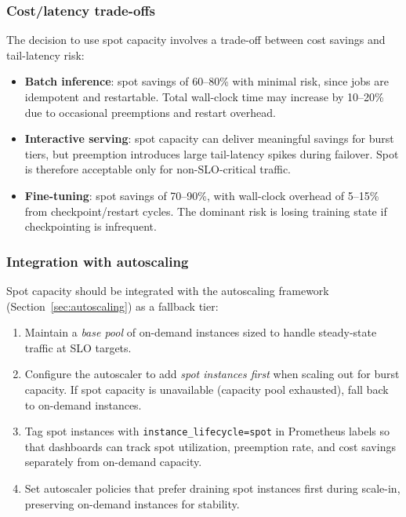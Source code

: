 \subsubsection{Cost/latency trade-offs}
The decision to use spot capacity involves a trade-off between cost savings and tail-latency risk:

\begin{itemize}
    \item \textbf{Batch inference}: spot savings of 60--80\% with minimal risk, since jobs are idempotent and restartable. Total wall-clock time may increase by 10--20\% due to occasional preemptions and restart overhead.
    \item \textbf{Interactive serving}: spot capacity can deliver meaningful savings for burst tiers, but preemption introduces large tail-latency spikes during failover. Spot is therefore acceptable only for non-SLO-critical traffic.
    \item \textbf{Fine-tuning}: spot savings of 70--90\%, with wall-clock overhead of 5--15\% from checkpoint/restart cycles. The dominant risk is losing training state if checkpointing is infrequent.
\end{itemize}

\subsubsection{Integration with autoscaling}
Spot capacity should be integrated with the autoscaling framework (Section~\ref{sec:autoscaling}) as a fallback tier:

\begin{enumerate}
    \item Maintain a \emph{base pool} of on-demand instances sized to handle steady-state traffic at SLO targets.
    \item Configure the autoscaler to add \emph{spot instances first} when scaling out for burst capacity. If spot capacity is unavailable (capacity pool exhausted), fall back to on-demand instances.
    \item Tag spot instances with \texttt{instance\_lifecycle=spot} in Prometheus labels so that dashboards can track spot utilization, preemption rate, and cost savings separately from on-demand capacity.
    \item Set autoscaler policies that prefer draining spot instances first during scale-in, preserving on-demand instances for stability.
\end{enumerate}


